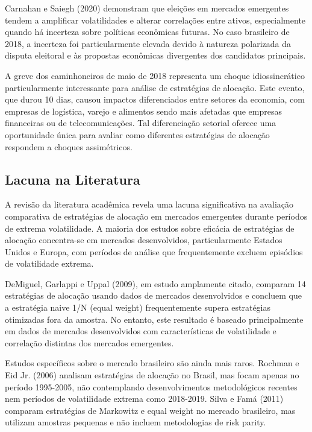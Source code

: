Carnahan e Saiegh (2020) demonstram que eleições em mercados emergentes tendem a amplificar volatilidades e alterar correlações entre ativos, especialmente quando há incerteza sobre políticas econômicas futuras. No caso brasileiro de 2018, a incerteza foi particularmente elevada devido à natureza polarizada da disputa eleitoral e às propostas econômicas divergentes dos candidatos principais.

A greve dos caminhoneiros de maio de 2018 representa um choque idiossincrático particularmente interessante para análise de estratégias de alocação. Este evento, que durou 10 dias, causou impactos diferenciados entre setores da economia, com empresas de logística, varejo e alimentos sendo mais afetadas que empresas financeiras ou de telecomunicações. Tal diferenciação setorial oferece uma oportunidade única para avaliar como diferentes estratégias de alocação respondem a choques assimétricos.

\subsection{Lacuna na Literatura}

A revisão da literatura acadêmica revela uma lacuna significativa na avaliação comparativa de estratégias de alocação em mercados emergentes durante períodos de extrema volatilidade. A maioria dos estudos sobre eficácia de estratégias de alocação concentra-se em mercados desenvolvidos, particularmente Estados Unidos e Europa, com períodos de análise que frequentemente excluem episódios de volatilidade extrema.

DeMiguel, Garlappi e Uppal (2009), em estudo amplamente citado, comparam 14 estratégias de alocação usando dados de mercados desenvolvidos e concluem que a estratégia naive 1/N (equal weight) frequentemente supera estratégias otimizadas fora da amostra. No entanto, este resultado é baseado principalmente em dados de mercados desenvolvidos com características de volatilidade e correlação distintas dos mercados emergentes.

Estudos específicos sobre o mercado brasileiro são ainda mais raros. Rochman e Eid Jr. (2006) analisam estratégias de alocação no Brasil, mas focam apenas no período 1995-2005, não contemplando desenvolvimentos metodológicos recentes nem períodos de volatilidade extrema como 2018-2019. Silva e Famá (2011) comparam estratégias de Markowitz e equal weight no mercado brasileiro, mas utilizam amostras pequenas e não incluem metodologias de risk parity.

